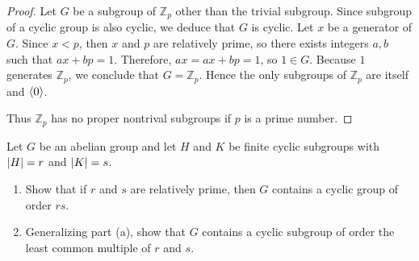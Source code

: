 \begin{proof}
    Let $G$ be a subgroup of $\mathbb{Z}_{p}$ other than the trivial subgroup. Since subgroup of a cyclic group is also cyclic, we deduce that $G$ is cyclic. Let $x$ be a generator of $G$. Since $x < p$, then $x$ and $p$ are relatively prime, so there exists integers $a, b$ such that $ax + bp = 1$. Therefore, $ax = ax + bp = 1$, so $1\in G$. Because $1$ generates $\mathbb{Z}_{p}$, we conclude that $G = \mathbb{Z}_{p}$. Hence the only subgroups of $\mathbb{Z}_{p}$ are itself and $\left\langle{0}\right\rangle$.

    Thus $\mathbb{Z}_{p}$ has no proper nontrival subgroups if $p$ is a prime number.
\end{proof}

\begin{exercise}
    Let $G$ be an abelian group and let $H$ and $K$ be finite cyclic subgroups with $\left\vert{H}\right\vert = r$ and $\left\vert{K}\right\vert = s$.
    \begin{enumerate}[label={\textbf{\alph*.}}]
        \item Show that if $r$ and $s$ are relatively prime, then $G$ contains a cyclic group of order $rs$.
        \item Generalizing part (a), show that $G$ contains a cyclic subgroup of order the least common multiple of $r$ and $s$.
    \end{enumerate}
\end{exercise}

